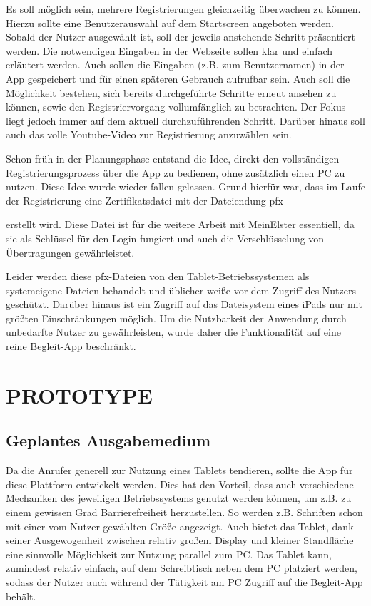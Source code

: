Es soll möglich sein, mehrere Registrierungen gleichzeitig überwachen zu können. Hierzu sollte eine Benutzerauswahl auf dem Startscreen angeboten werden. Sobald der Nutzer ausgewählt ist, soll der jeweils anstehende Schritt präsentiert werden. Die notwendigen Eingaben in der Webseite sollen klar und einfach erläutert werden. Auch sollen die Eingaben (z.B. zum Benutzernamen) in der App gespeichert und für einen späteren Gebrauch aufrufbar sein.
Auch soll die Möglichkeit bestehen, sich bereits durchgeführte Schritte erneut ansehen zu können, sowie den Registriervorgang vollumfänglich zu betrachten. Der Fokus liegt jedoch immer auf dem aktuell durchzuführenden Schritt. Darüber hinaus soll auch das volle Youtube-Video zur Registrierung anzuwählen sein.

Schon früh in der Planungsphase entstand die Idee, direkt den vollständigen Registrierungsprozess über die App zu bedienen, ohne zusätzlich einen PC zu nutzen. Diese Idee wurde wieder fallen gelassen. Grund hierfür war, dass im Laufe der Registrierung eine Zertifikatsdatei mit der Dateiendung \grq{}pfx{\grq{} erstellt wird. Diese Datei ist für die weitere Arbeit mit MeinElster essentiell, da sie als Schlüssel für den Login fungiert und auch die Verschlüsselung von Übertragungen gewährleistet.

 Leider werden diese \grq{}pfx-Dateien\grq{} von den Tablet-Betriebssystemen als systemeigene Dateien behandelt und üblicher weiße vor dem Zugriff des Nutzers geschützt. Darüber hinaus ist ein Zugriff auf das Dateisystem eines iPads nur mit größten Einschränkungen möglich. Um die Nutzbarkeit der Anwendung durch unbedarfte Nutzer zu gewährleisten, wurde daher die Funktionalität auf eine reine Begleit-App beschränkt.


\section{PROTOTYPE}\label{PROTOTYPE}

\subsection{Geplantes Ausgabemedium}\label{Geplantes Ausgabemedium}
Da die Anrufer generell zur Nutzung eines Tablets tendieren, sollte die App für diese Plattform entwickelt werden. Dies hat den Vorteil, dass auch verschiedene Mechaniken des jeweiligen Betriebssystems genutzt werden können, um z.B. zu einem gewissen Grad Barrierefreiheit herzustellen. So werden z.B. Schriften schon mit einer vom Nutzer gewählten Größe angezeigt. Auch bietet das Tablet, dank seiner Ausgewogenheit zwischen relativ großem Display und kleiner Standfläche eine sinnvolle Möglichkeit zur Nutzung parallel zum PC. Das Tablet kann, zumindest relativ einfach, auf dem Schreibtisch neben dem PC platziert werden, sodass der Nutzer auch während der Tätigkeit am PC Zugriff auf die Begleit-App behält. 

}
